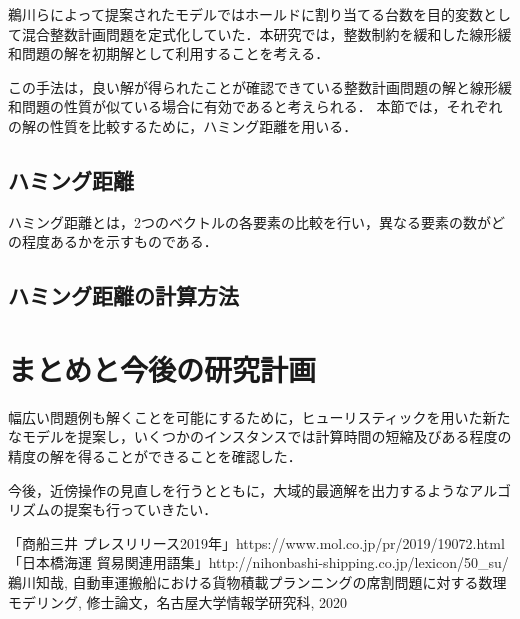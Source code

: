 \documentclass[a4j,11pt,twocolumn]{jsarticle}
\begin{document}
鵜川らによって提案されたモデル\cite{ukawa}ではホールドに割り当てる台数を目的変数として混合整数計画問題を定式化していた．本研究では，整数制約を緩和した線形緩和問題の解を初期解として利用することを考える．

この手法は，良い解が得られたことが確認できている整数計画問題\cite{ukawa}の解と線形緩和問題の性質が似ている場合に有効であると考えられる．
本節では，それぞれの解の性質を比較するために，ハミング距離を用いる．
\subsection{ハミング距離}
ハミング距離とは，2つのベクトルの各要素の比較を行い，異なる要素の数がどの程度あるかを示すものである．


\subsection{ハミング距離の計算方法}






\section{まとめと今後の研究計画}
幅広い問題例も解くことを可能にするために，ヒューリスティックを用いた新たなモデルを提案し，いくつかのインスタンスでは計算時間の短縮及びある程度の精度の解を得ることができることを確認した．

今後，近傍操作の見直しを行うとともに，大域的最適解を出力するようなアルゴリズムの提案も行っていきたい．

\begin{thebibliography}{2}
  「商船三井 プレスリリース2019年」https://www.mol.co.jp/pr/2019/19072.html
  「日本橋海運 貿易関連用語集」http://nihonbashi-shipping.co.jp/lexicon/50\_su/
 鵜川知哉, 自動車運搬船における貨物積載プランニングの席割問題に対する数理モデリング, 修士論文，名古屋大学情報学研究科, 2020
\end{thebibliography}
\end{document}
